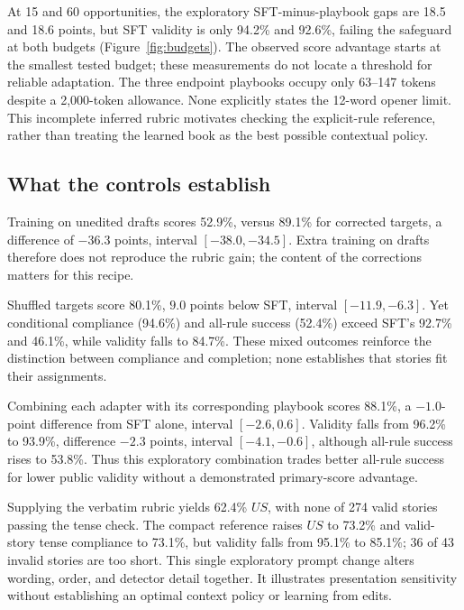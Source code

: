 \documentclass[10pt,twocolumn,letterpaper]{article}
\newcommand{\claim}[2]{#2}
\begin{document}
\claim{C65}{At 15 and 60 opportunities, the exploratory SFT-minus-playbook gaps are 18.5 and 18.6 points, but SFT validity is only 94.2\% and 92.6\%, failing the safeguard at both budgets (Figure~\ref{fig:budgets}). The observed score advantage starts at the smallest tested budget; these measurements do not locate a threshold for reliable adaptation.}
\claim{C66}{The three endpoint playbooks occupy only 63--147 tokens despite a 2,000-token allowance. None explicitly states the 12-word opener limit. This incomplete inferred rubric motivates checking the explicit-rule reference, rather than treating the learned book as the best possible contextual policy.}

\subsection{What the controls establish}
\claim{C68}{Training on unedited drafts scores 52.9\%, versus 89.1\% for corrected targets, a difference of $-36.3$ points, interval $[-38.0,-34.5]$. Extra training on drafts therefore does not reproduce the rubric gain; the content of the corrections matters for this recipe.}

\claim{C69}{Shuffled targets score 80.1\%, $9.0$ points below SFT, interval $[-11.9,-6.3]$. Yet conditional compliance (94.6\%) and all-rule success (52.4\%) exceed SFT's 92.7\% and 46.1\%, while validity falls to 84.7\%. These mixed outcomes reinforce the distinction between compliance and completion; none establishes that stories fit their assignments.}

\claim{C67}{Combining each adapter with its corresponding playbook scores 88.1\%, a $-1.0$-point difference from SFT alone, interval $[-2.6,0.6]$. Validity falls from 96.2\% to 93.9\%, difference $-2.3$ points, interval $[-4.1,-0.6]$, although all-rule success rises to 53.8\%. Thus this exploratory combination trades better all-rule success for lower public validity without a demonstrated primary-score advantage.}

\claim{C70}{Supplying the verbatim rubric yields 62.4\% $US$, with none of 274 valid stories passing the tense check. The compact reference raises $US$ to 73.2\% and valid-story tense compliance to 73.1\%, but validity falls from 95.1\% to 85.1\%; 36 of 43 invalid stories are too short. This single exploratory prompt change alters wording, order, and detector detail together. It illustrates presentation sensitivity without establishing an optimal context policy or learning from edits.}
\end{document}
